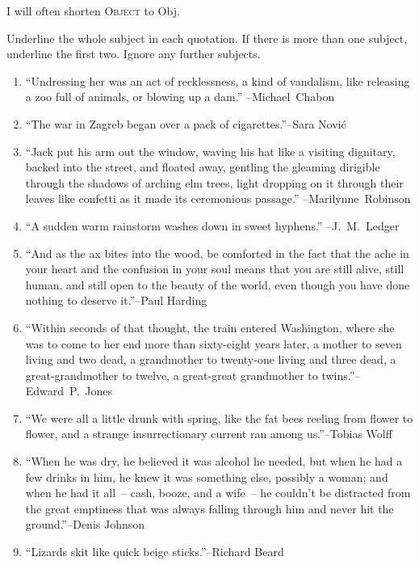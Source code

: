 I will often shorten \textsc{Object} to Obj.

\begin{tcolorbox}[title=Exercises, colback=white]
    Underline the whole subject in each quotation. If there is more than one subject, underline the first two. Ignore any further subjects.
    \begin{enumerate}[noitemsep]
        \item ``Undressing her was an act of recklessness, a kind of vandalism, like releasing a zoo full of animals, or blowing up a dam.'' \phantom{xxxxxxxxxxxxxx} \hfill--Michael~Chabon
       \item ``The war in Zagreb began over a pack of cigarettes.''\hfill--Sara Nović
       \item ``Jack put his arm out the window, waving his hat like a visiting dignitary, backed into the street, and floated away, gentling the gleaming dirigible through the shadows of arching elm trees, light dropping on it through their leaves like confetti as it made its ceremonious passage.'' \phantom{xxxxxxxx} \hfill--Marilynne~Robinson
     \item ``A sudden warm rainstorm washes down in sweet hyphens.''\phantom{xxxxxxxx} \hfill--J.~M.~Ledger
     \item ``And as the ax bites into the wood, be comforted in the fact that the ache in your heart and the confusion in your soul means that you are still alive, still human, and still open to the beauty of the world, even though you have done nothing to deserve it.''\hfill--Paul Harding
     \item ``Within seconds of that thought, the train entered Washington, where she was to come to her end more than sixty-eight years later, a mother to seven living and two dead, a grandmother to twenty-one living and three dead, a great-grandmother to twelve, a great-great grandmother to twins.''\hfill--Edward~P.~Jones
     \item ``We were all a little drunk with spring, like the fat bees reeling from flower to flower, and a strange insurrectionary current ran among us.''\hfill--Tobias Wolff
     \item ``When he was dry, he believed it was alcohol he needed, but when he had a few drinks in him, he knew it was something else, possibly a woman; and when he had it all~-- cash, booze, and a wife~-- he couldn't be distracted from the great emptiness that was always falling through him and never hit the ground.''\hfill--Denis Johnson
     \item ``Lizards skit like quick beige sticks.''\hfill--Richard Beard
    \end{enumerate}
\end{tcolorbox}
